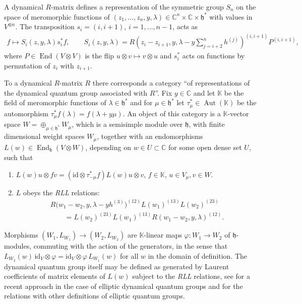 \documentclass[pdftex]{sigma}
\numberwithin{equation}{section}
\begin{document}
A dynamical $R$-matrix defines a representation of the symmetric group $S_n$ on the space of meromorphic functions of $(z_1,\dots,z_n,y,\lambda)\in\mathbb C^n\times \mathbb C\times\mathfrak h^*$ with values in $V^{\otimes n}$. The transposition $s_i=(i,i+1)$, $i=1,\dots,n-1$, acts as
\begin{gather}\label{e-Si}
f\mapsto S_i(z,y,\lambda)s_i^*f,\qquad S_i(z,y,\lambda)=R(z_i-z_{i+1},y,\lambda-y\sum_{j={i+2}}^{n}h^{(j)})^{(i,i+1)} P^{(i,i+1)},
\end{gather}
where $P\in\operatorname{End}(V\otimes V)$ is the flip $u\otimes v\mapsto v\otimes u$ and $s_i^*$ acts on functions by permutation of $z_i$ with $z_{i+1}$.

To a dynamical $R$-matrix $R$ there corresponds a category ``of representations of the dynamical quantum group associated with $R$''. Fix $y\in\mathbb C$ and let $\mathbb K$ be the field of meromorphic functions of $\lambda\in\mathfrak h^*$ and for $\mu\in\mathfrak h^*$ let $\tau_\mu^*\in\operatorname{Aut}(\mathbb K)$ be the automorphism $\tau_\mu^*f(\lambda)=f(\lambda+y\mu)$. An object of this category is a $\mathbb K$-vector space $W=\oplus_{\mu\in\mathfrak h^*}W_\mu$, which is a semisimple module over $\mathfrak h$, with finite dimensional weight spaces $W_\mu$, together with an endomorphisms $L(w)\in\operatorname{End}_{\mathfrak h}(V\otimes W)$, depending on $w\in U\subset\mathbb C$ for some open dense set $U$, such that
\begin{enumerate}\itemsep=0pt
\item[(i)] $L(w)u\otimes fv=(\mathrm{id}\otimes\tau^*_{-\mu}f) L(w)u\otimes v$, $f\in \mathbb K$, $u\in V_\mu,v\in W$.
\item[(ii)] $L$ obeys the {\it RLL} relations:
 \begin{gather*}
 R\big(w_1-w_2,y,\lambda-y h^{(3)}\big)^{(12)}L(w_1)^{(13)} L(w_2)^{(23)} \\
 \qquad {}= L(w_2)^{(23)}L(w_1)^{(13)} R(w_1-w_2,y,\lambda)^{(12)}.
 \end{gather*}
\end{enumerate}
Morphisms $(W_1,L_{W_1})\to (W_2,L_{W_2})$ are $\mathbb K$-linear maps $\varphi\colon W_1\to W_2$ of $\mathfrak h$-modules, commuting with the action of the generators, in the sense that $L_{W_2}(w)\,\mathrm{id}_V\otimes \varphi=\mathrm{id}_V\otimes \varphi\, L_{W_1}(w)$ for all $w$ in the domain of definition. The dynamical quantum group itself may be defined as generated by Laurent coefficients of matrix elements of $L(w)$ subject to the {\em RLL} relations, see \cite{Konno} for a recent approach in the case of elliptic dynamical quantum groups and for the relations with other definitions of elliptic quantum groups.
\end{document}
